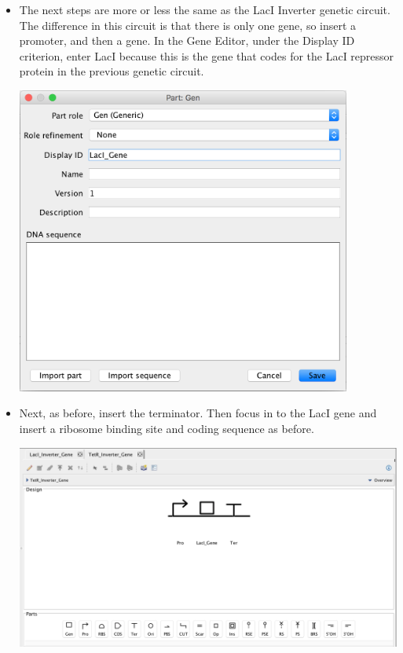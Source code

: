 \documentclass[titlepage,11pt]{article}
\begin{document}
\begin{itemize}
\item The next steps are more or less the same as the LacI Inverter genetic circuit. The difference in this circuit is that there is only one gene, so insert a promoter, and then a gene. In the Gene Editor, under the Display ID criterion, enter LacI because this is the gene that codes for the LacI repressor protein in the previous genetic circuit.

\begin{center}
\includegraphics[width=110mm]{screenshots/PartLacIGene}
\end{center}

\item Next, as before, insert the terminator. Then focus in to the LacI gene and insert a ribosome binding site and coding sequence as before.

\begin{center}
\includegraphics[width=160mm]{screenshots/PartTetRAssembled}
\end{center}


\end{itemize}
\end{document}
